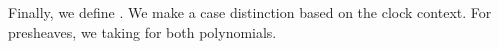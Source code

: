 Finally, we define .
We make a case distinction based on the clock context.
For presheaves, we  taking  for both polynomials.

\begin{code}%
\>[0]\AgdaSpace{}%
\AgdaSymbol{:}\AgdaSpace{}%
\AgdaSymbol{\{}\AgdaSpace{}%
\AgdaSymbol{:}\AgdaSpace{}%
\AgdaSymbol{\}}\AgdaSpace{}%
\AgdaSpace{}%
\AgdaSymbol{(}\AgdaSpace{}%
\AgdaSymbol{:}\AgdaSpace{}%
\AgdaSpace{}%
\AgdaSymbol{)}\AgdaSpace{}%
\AgdaSpace{}%
\AgdaSpace{}%
\<%
\\
\>[0]\AgdaSpace{}%
\AgdaSymbol{\{}\AgdaSymbol{\}}\AgdaSpace{}%
\AgdaSpace{}%
\AgdaSymbol{=}\AgdaSpace{}%
\AgdaSpace{}%
\AgdaSpace{}%
\<%
\end{code}

